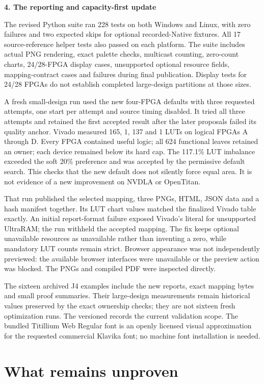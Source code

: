 \documentclass[11pt]{article}
\newcommand{\code}[1]{\texttt{\detokenize{#1}}}
\newcommand{\heading}[1]{\textbf{#1}\par}
\begin{document}
\heading{4. The reporting and capacity-first update}
The revised Python suite ran 228 tests on both Windows and Linux, with zero failures and two expected skips for optional recorded-Native fixtures. All 17 source-reference helper tests also passed on each platform. The suite includes actual PNG rendering, exact palette checks, multicast counting, zero-count charts, 24/28-FPGA display cases, unsupported optional resource fields, mapping-contract cases and failures during final publication. Display tests for 24/28 FPGAs do not establish completed large-design partitions at those sizes.

A fresh small-design run used the new four-FPGA defaults with three requested attempts, one start per attempt and source timing disabled. It tried all three attempts and retained the first accepted result after the later proposals failed its quality anchor. Vivado measured 165, 1, 137 and 1 LUTs on logical FPGAs A through D. Every FPGA contained useful logic; all 624 functional leaves retained an owner; each device remained below its hard cap. The 117.1\% LUT imbalance exceeded the soft 20\% preference and was accepted by the permissive default search. This checks that the new default does not silently force equal area. It is not evidence of a new improvement on NVDLA or OpenTitan.

That run published the selected mapping, three PNGs, HTML, JSON data and a hash manifest together. Its LUT chart values matched the finalized Vivado table exactly. An initial report-format failure exposed Vivado's literal \code{NA} for unsupported UltraRAM; the run withheld the accepted mapping. The fix keeps optional unavailable resources as unavailable rather than inventing a zero, while mandatory LUT counts remain strict. Browser appearance was not independently previewed: the available browser interfaces were unavailable or the preview action was blocked. The PNGs and compiled PDF were inspected directly.

The sixteen archived J4 examples include the new reports, exact mapping bytes and small proof summaries. Their large-design measurements remain historical values preserved by the exact ownership checks; they are not sixteen fresh optimization runs. The versioned  records the current validation scope. The bundled Titillium Web Regular font is an openly licensed visual approximation for the requested commercial Klavika font; no machine font installation is needed.

\section{What remains unproven}
\end{document}
